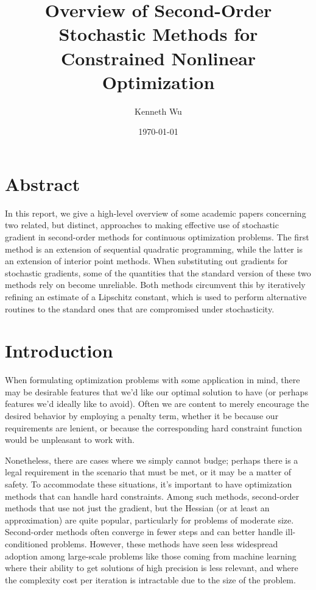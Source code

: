 \documentclass[12pt]{article}
\title{
\vspace{-3.0em}
Overview of Second-Order Stochastic Methods for Constrained Nonlinear Optimization}
\author{Kenneth Wu}
\date{\today
}
\newcommand{\1}{\scalebox{1.06}{\ensuremath{\mathrel{\mathmybb{1}}}}}
\theoremstyle{definition}
\begin{document}
\vspace{-2.0em}
\maketitle\vspace{-1.5em}

\section*{Abstract}
\small
In this report, we give a high-level overview of some academic papers concerning two related, but distinct, approaches to making effective use of stochastic gradient in second-order methods for continuous optimization problems. 
The first method is an extension of sequential quadratic programming, while the latter is an extension of interior point methods.
When substituting out gradients for stochastic gradients, some of the quantities that the standard version of these two methods rely on become unreliable. Both methods circumvent this by iteratively refining an estimate of a Lipschitz constant, which is used to perform alternative routines to the standard ones that are compromised under stochasticity.

\section*{Introduction}
\normalsize
When formulating optimization problems with some application in mind, there may be desirable features that we'd like our optimal solution to have (or perhaps features we'd ideally like to avoid). Often we are content to merely encourage the desired behavior by employing a penalty term, whether it be because our requirements are lenient, or because the corresponding hard constraint function would be unpleasant to work with. 

Nonetheless, there are cases where we simply cannot budge; perhaps there is a legal requirement in the scenario that must be met, or it may be a matter of safety. To accommodate these situations, it's important to have optimization methods that can handle hard constraints. Among such methods, second-order methods that use not just the gradient, but the Hessian (or at least an approximation) are quite popular, particularly for problems of moderate size. Second-order methods often converge in fewer steps and can better handle ill-conditioned problems. However, these methods have seen less widespread adoption among large-scale problems like those coming from machine learning where their ability to get solutions of high precision is less relevant, and where the complexity cost per iteration is intractable due to the size of the problem.
\end{document}
